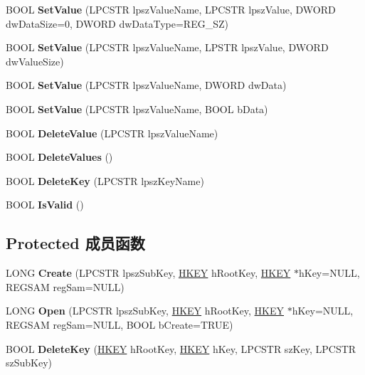 \begin{DoxyCompactItemize}
B\+O\+OL {\bfseries Set\+Value} (L\+P\+C\+S\+TR lpsz\+Value\+Name, L\+P\+C\+S\+TR lpsz\+Value, D\+W\+O\+RD dw\+Data\+Size=0, D\+W\+O\+RD dw\+Data\+Type=R\+E\+G\+\_\+\+SZ)
\item 
\mbox{\label{class_c_reg_a17782fa5de3f9d256ff7787981c858a7}} 
B\+O\+OL {\bfseries Set\+Value} (L\+P\+C\+S\+TR lpsz\+Value\+Name, L\+P\+S\+TR lpsz\+Value, D\+W\+O\+RD dw\+Value\+Size)
\item 
\mbox{\label{class_c_reg_a64161b4c898a2e957df2a4c41068c100}} 
B\+O\+OL {\bfseries Set\+Value} (L\+P\+C\+S\+TR lpsz\+Value\+Name, D\+W\+O\+RD dw\+Data)
\item 
\mbox{\label{class_c_reg_aacd25e6c55e2d8f5541fcc07987d904c}} 
B\+O\+OL {\bfseries Set\+Value} (L\+P\+C\+S\+TR lpsz\+Value\+Name, B\+O\+OL b\+Data)
\item 
\mbox{\label{class_c_reg_a44815699ff73d3b4a82bd07809f0916f}} 
B\+O\+OL {\bfseries Delete\+Value} (L\+P\+C\+S\+TR lpsz\+Value\+Name)
\item 
\mbox{\label{class_c_reg_a4269f9cc345761468aae17f2fb9bad07}} 
B\+O\+OL {\bfseries Delete\+Values} ()
\item 
\mbox{\label{class_c_reg_a02be567e9bb5baf963998aec6c43d9fa}} 
B\+O\+OL {\bfseries Delete\+Key} (L\+P\+C\+S\+TR lpsz\+Key\+Name)
\item 
\mbox{\label{class_c_reg_abc6126bb6d949e668393a0928ba3db6c}} 
B\+O\+OL {\bfseries Is\+Valid} ()
\end{DoxyCompactItemize}
\subsection*{Protected 成员函数}
\begin{DoxyCompactItemize}
\item 
\mbox{\label{class_c_reg_aca931cdcc8cfd1e580d6f7ccd408ec01}} 
L\+O\+NG {\bfseries Create} (L\+P\+C\+S\+TR lpsz\+Sub\+Key, \hyperlink{interfacevoid}{H\+K\+EY} h\+Root\+Key, \hyperlink{interfacevoid}{H\+K\+EY} $\ast$h\+Key=N\+U\+LL, R\+E\+G\+S\+AM reg\+Sam=N\+U\+LL)
\item 
\mbox{\label{class_c_reg_aaf1685a23437822e26d8b5befcfa3de1}} 
L\+O\+NG {\bfseries Open} (L\+P\+C\+S\+TR lpsz\+Sub\+Key, \hyperlink{interfacevoid}{H\+K\+EY} h\+Root\+Key, \hyperlink{interfacevoid}{H\+K\+EY} $\ast$h\+Key=N\+U\+LL, R\+E\+G\+S\+AM reg\+Sam=N\+U\+LL, B\+O\+OL b\+Create=T\+R\+UE)
\item 
\mbox{\label{class_c_reg_a151545304369943bf048d7cb07a16cd4}} 
B\+O\+OL {\bfseries Delete\+Key} (\hyperlink{interfacevoid}{H\+K\+EY} h\+Root\+Key, \hyperlink{interfacevoid}{H\+K\+EY} h\+Key, L\+P\+C\+S\+TR sz\+Key, L\+P\+C\+S\+TR sz\+Sub\+Key)
\end{DoxyCompactItemize}
